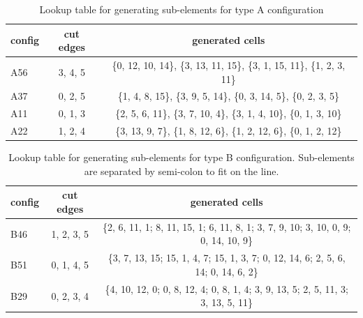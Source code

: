 \begin{table}[H]
\begin{center}
\caption{\label{table:lutcutA}{Lookup table for generating sub-elements for type A configuration}}
  \begin{tabular}{ | l | c | c | }
    \hline    
    config & cut edges & generated cells \\ \hline \hline    
    A56 & 3, 4, 5 & \{0, 12, 10, 14\}, \{3, 13, 11, 15\}, \{3, 1, 15, 11\}, \{1, 2, 3, 11\} \\ \hline
    A37 & 0, 2, 5 & \{1, 4, 8, 15\}, \{3, 9, 5, 14\}, \{0, 3, 14, 5\}, \{0, 2, 3, 5\} \\ \hline
    A11 & 0, 1, 3 & \{2, 5, 6, 11\}, \{3, 7, 10, 4\}, \{3, 1, 4, 10\}, \{0, 1, 3, 10\} \\ \hline
    A22 & 1, 2, 4 & \{3, 13, 9, 7\}, \{1, 8, 12, 6\}, \{1, 2, 12, 6\}, \{0, 1, 2, 12\} \\ \hline
    \hline
  \end{tabular}
\end{center}
\end{table}

\begin{table}[H]
\begin{center}
\caption{\label{table:lutcutB}{Lookup table for generating sub-elements for type B configuration. 
Sub-elements are separated by semi-colon to fit on the line.}}
  \begin{tabular}{ | l | c | c | }
    \hline    
    config & cut edges & generated cells \\ \hline \hline    
    B46 & 1, 2, 3, 5 & \{2, 6, 11, 1; 8, 11, 15, 1; 6, 11, 8, 1; 3, 7, 9, 10; 3, 10, 0, 9; 0, 14, 10, 9\} \\ \hline
    B51 & 0, 1, 4, 5 & \{3, 7, 13, 15; 15, 1, 4, 7; 15, 1, 3, 7; 0, 12, 14, 6; 2, 5, 6, 14; 0, 14, 6, 2\} \\ \hline
    B29 & 0, 2, 3, 4 & \{4, 10, 12, 0; 0, 8, 12, 4; 0, 8, 1, 4; 3, 9, 13, 5; 2, 5, 11, 3; 3, 13, 5, 11\} \\ \hline
    \hline
  \end{tabular}
\end{center}
\end{table}



